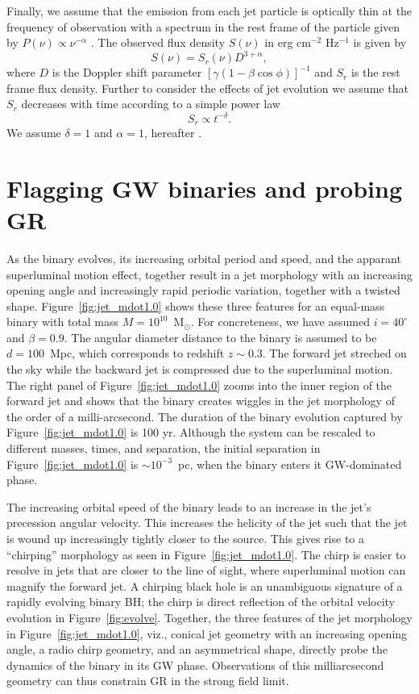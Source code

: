 \documentclass[a4paper,fleqn,usenatbib]{mnras}
\begin{document}
Finally, we assume that the emission from each jet particle is
optically thin at the frequency of observation with a spectrum in the
rest frame of the particle given by $P(\nu)\propto \nu^{-\alpha}$
\citep{1982ApJ...262..478G}.  The observed flux density $S(\nu)$ in erg
cm$^{-2}$ Hz$^{-1}$ is given by
\begin{equation}
  S(\nu)=S_r(\nu)D^{3+\alpha},
\end{equation}
where $D$ is the Doppler shift parameter
$[\gamma(1-\beta\cos\phi)]^{-1}$ and $S_r$ is the rest frame flux
density.  Further to consider the effects of jet evolution we assume
that $S_r$ decreases with time according to a simple power law
\begin{equation}
  S_r\propto t^{-\delta}.
\end{equation}
We assume $\delta=1$ and $\alpha=1$, hereafter
\citep{1982ApJ...262..478G}.

\section{Flagging GW binaries and probing GR}

As the binary evolves, its increasing orbital period and speed, and
the apparant superluminal motion effect, together result in a jet
morphology with an increasing opening angle and increasingly rapid
periodic variation, together with a twisted shape.
Figure~\ref{fig:jet_mdot1.0} shows these three features for an
equal-mass binary with total mass $M=10^{10}$~M$_\odot$.  For
concreteness, we have assumed $i=40^\circ$ and $\beta=0.9$.  The
angular diameter distance to the binary is assumed to be $d =
100$~Mpc, which corresponds to redshift $z\sim 0.3$.  The forward jet
streched on the sky while the backward jet is compressed due to the
superluminal motion.  The right panel of Figure~\ref{fig:jet_mdot1.0}
zooms into the inner region of the forward jet and shows that the
binary creates wiggles in the jet morphology of the order of a
milli-arcsecond.  The duration of the binary evolution captured by
Figure~\ref{fig:jet_mdot1.0} is 100 yr.  Although the system can be
rescaled to different masses, times, and separation, the initial
separation in Figure~\ref{fig:jet_mdot1.0} is $\sim 10^{-3}$~pc, when
the binary enters it GW-dominated phase.  

The increasing orbital speed of the binary leads to an increase in the
jet's precession angular velocity.  This increases the helicity of the
jet such that the jet is wound up increasingly tightly closer to the
source.  This gives rise to a ``chirping'' morphology as seen in
Figure~\ref{fig:jet_mdot1.0}.  The chirp is easier to resolve in jets
that are closer to the line of sight, where superluminal motion can
magnify the forward jet.  A chirping black hole is an unambiguous
signature of a rapidly evolving binary BH; the chirp is direct
reflection of the orbital velocity evolution in
Figure~\ref{fig:evolve}.  Together, the three features of the jet
morphology in Figure~\ref{fig:jet_mdot1.0}, viz., conical jet geometry
with an increasing opening angle, a radio chirp geometry, and an
asymmetrical shape, directly probe the dynamics of the binary in its
GW phase. Observations of this milliarcsecond geometry can thus
constrain GR in the strong field limit.
\end{document}
